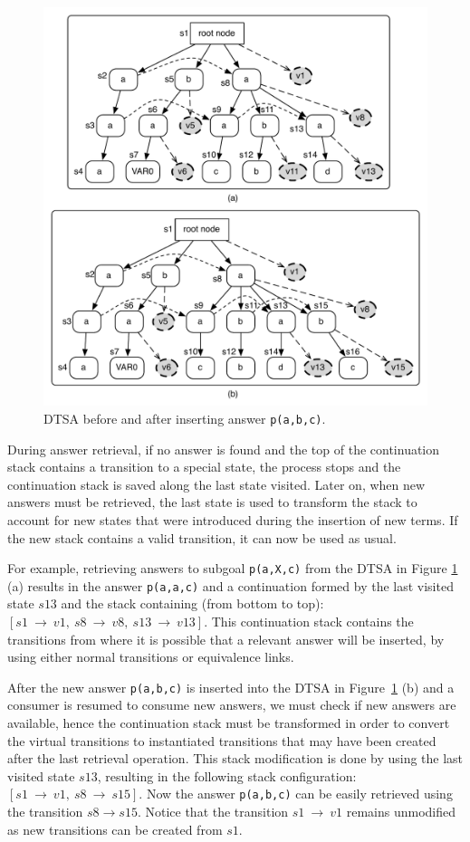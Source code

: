 \begin{figure}[ht]
  \centering
    \includegraphics[scale=0.6]{dtsa.pdf}
  \caption{DTSA before and after inserting answer \texttt{p(a,b,c)}.}
  \label{fig:dtsa_example}
\end{figure}

During answer retrieval, if no answer is found and the top of the continuation stack contains
a transition to a special state, the process stops and the continuation stack is saved along the last state
visited.
Later on, when new answers must be retrieved, the last state is used to transform the stack to account for new states that
were introduced during the insertion of new terms. If the new stack contains a valid transition, it
can now be used as usual.

For example, retrieving answers to subgoal \texttt{p(a,X,c)} from the DTSA in Figure
\ref{fig:dtsa_example} (a) results in the answer \texttt{p(a,a,c)} and a continuation
formed by the last visited state $s13$ and the stack containing (from bottom to top):
$[s1~\rightarrow~v1,~s8~\rightarrow~v8,~s13~\rightarrow~v13]$.
This continuation stack contains the transitions from where it is possible that a relevant
answer will be inserted, by using either normal transitions or equivalence links.

After the new answer \texttt{p(a,b,c)} is inserted into the DTSA in Figure~\ref{fig:dtsa_example}
(b) and a consumer is resumed to consume new answers, we must check if new answers are available,
hence the continuation stack must be transformed in order to convert the virtual transitions to
instantiated transitions that may have been created after the last retrieval operation.
This stack modification is done by using the last visited state $s13$, resulting in the following
stack configuration: $[s1~\rightarrow~v1,~s8~\rightarrow~s15]$.
Now the answer \texttt{p(a,b,c)} can be easily retrieved using the transition $s8 \rightarrow s15$.
Notice that the transition $s1~\rightarrow~v1$ remains unmodified as new transitions can be created
from $s1$.

